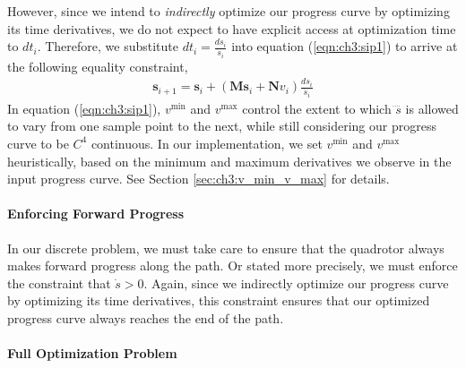 However, since we intend to \emph{indirectly} optimize our progress curve by optimizing its time derivatives, we do not expect to have explicit access at optimization time to $dt_i$.
Therefore, we substitute $dt_i = \frac{ds_i}{\dot{s}_i}$ into equation (\ref{eqn:ch3:sip1}) to arrive at the following equality constraint,
%
\begin{equation}
\begin{aligned}
\mathbf{s}_{i+1} = \mathbf{s}_{i} + (\mathbf{M}\mathbf{s}_{i} + \mathbf{N}v_{i}) \frac{ds_i}{\dot{s}_i}
\end{aligned}
\end{equation}
%
In equation (\ref{eqn:ch3:sip1}), $v^{\text{min}}$ and $v^{\text{max}}$ control the extent to which $\ddddot{s}$ is allowed to vary from one sample point to the next, while still considering our progress curve to be $C^4$ continuous.
In our implementation, we set $v^{\text{min}}$ and $v^{\text{max}}$ heuristically, based on the minimum and maximum derivatives we observe in the input progress curve.
See Section \ref{sec:ch3:v_min_v_max} for details.

\paragraph{Enforcing Forward Progress}
In our discrete problem, we must take care to ensure that the quadrotor always makes forward progress along the path.
Or stated more precisely, we must enforce the constraint that $\dot{s} > 0$.
Again, since we indirectly optimize our progress curve by optimizing its time derivatives, this constraint ensures that our optimized progress curve always reaches the end of the path.

\paragraph{Full Optimization Problem}

